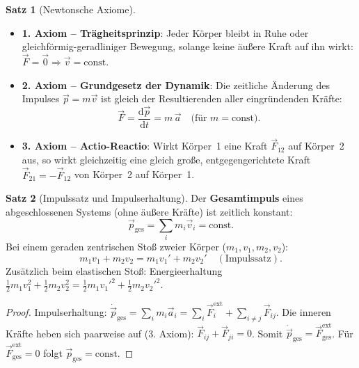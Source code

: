 ﻿\documentclass[a4paper,12pt]{report}
\theoremstyle{definition}
\newtheorem{satz}{Satz}
\begin{document}
\begin{satz}[Newtonsche Axiome]
\begin{itemize}
    \item[-] \textbf{1. Axiom -- Tr\"agheitsprinzip}: Jeder K\"orper bleibt in Ruhe
          oder gleichf\"ormig-geradliniger Bewegung, solange keine \"au\ss{}ere Kraft
          auf ihn wirkt: $\vec{F} = \vec{0} \Rightarrow \vec{v} = \mathrm{const}$.
    \item[-] \textbf{2. Axiom -- Grundgesetz der Dynamik}: Die zeitliche \"Anderung
          des Impulses $\vec{p} = m\vec{v}$ ist gleich der Resultierenden aller
          eingr\"undenden Kr\"afte:
          \[
            \vec{F} = \frac{\mathrm{d}\vec{p}}{\mathrm{d}t} = m\,\vec{a}
            \quad \text{(f\"ur } m = \mathrm{const}\text{)}.
          \]
    \item[-] \textbf{3. Axiom -- Actio-Reactio}: Wirkt K\"orper~1 eine Kraft
          $\vec{F}_{12}$ auf K\"orper~2 aus, so wirkt gleichzeitig eine gleich
          gro\ss{}e, entgegengerichtete Kraft $\vec{F}_{21} = -\vec{F}_{12}$ von
          K\"orper~2 auf K\"orper~1.
\end{itemize}
\end{satz}

\begin{satz}[Impulssatz und Impulserhaltung]
Der \textbf{Gesamtimpuls} eines abgeschlossenen Systems (ohne \"au\ss{}ere Kr\"afte)
ist zeitlich konstant:
\[
  \vec{p}_{\text{ges}} = \sum_i m_i \vec{v}_i = \mathrm{const}.
\]
Bei einem geraden zentrischen Sto\ss{} zweier K\"orper ($m_1, v_1, m_2, v_2$):
\[
  m_1 v_1 + m_2 v_2 = m_1 v_1' + m_2 v_2' \quad (\text{Impulssatz}).
\]
Zus\"atzlich beim elastischen Sto\ss{}: Energieerhaltung
$\tfrac{1}{2}m_1 v_1^2 + \tfrac{1}{2}m_2 v_2^2 = \tfrac{1}{2}m_1 v_1'^2 + \tfrac{1}{2}m_2 v_2'^2$.
\end{satz}
\begin{proof}
Impulserhaltung: $\dot{\vec{p}}_{\text{ges}} = \sum_i m_i \vec{a}_i
= \sum_i \vec{F}_i^{\text{ext}} + \sum_{i\neq j}\vec{F}_{ij}$.
Die inneren Kr\"afte heben sich paarweise auf (3. Axiom): $\vec{F}_{ij} + \vec{F}_{ji} = 0$.
Somit $\dot{\vec{p}}_{\text{ges}} = \vec{F}^{\text{ext}}_{\text{ges}}$.
F\"ur $\vec{F}^{\text{ext}}_{\text{ges}} = 0$ folgt $\vec{p}_{\text{ges}} = \mathrm{const}$.
\end{proof}
\end{document}
